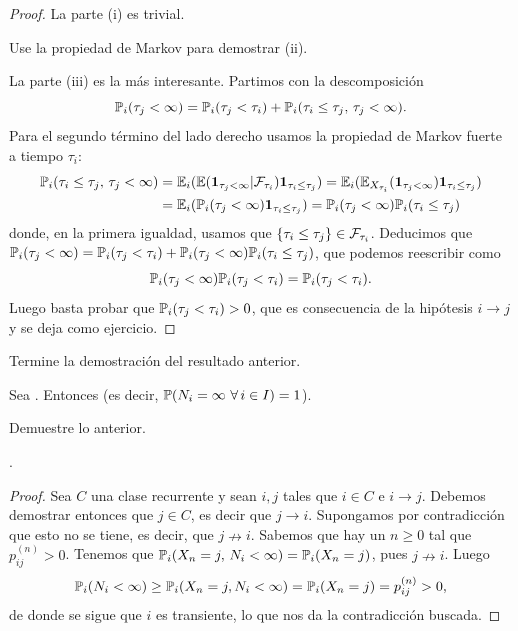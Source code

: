 \begin{proof}
La parte (i) es trivial.

\begin{exer}
Use la propiedad de Markov para demostrar (ii).
\end{exer}
\noindent La parte (iii) es la más interesante.
Partimos con la descomposición
\[\mathbb{P}_i(\tau_j<\infty)=\mathbb{P}_i(\tau_j<\tau_i)+\mathbb{P}_i(\tau_i\leq\tau_j,\,\tau_j<\infty).\]
Para el segundo término del lado derecho usamos la propiedad de Markov fuerte a tiempo $\tau_i$:
\begin{align}
\mathbb{P}_i(\tau_i\leq\tau_j,\,\tau_j<\infty)&=\mathbb{E}_i(\mathbb{E}(\mathbf{1}_{\tau_j<\infty}|\mathcal{F}_{\tau_i})\mathbf{1}_{\tau_i\leq\tau_j})=\mathbb{E}_i(\mathbb{E}_{X_{\tau_i}}(\mathbf{1}_{\tau_j<\infty})\mathbf{1}_{\tau_i\leq\tau_j})\\
&=\mathbb{E}_i(\mathbb{P}_i(\tau_j<\infty)\mathbf{1}_{\tau_i\leq\tau_j})=\mathbb{P}_i(\tau_j<\infty)\mathbb{P}_i(\tau_i\leq\tau_j)
\end{align}
donde, en la primera igualdad, usamos que $\{\tau_i\leq\tau_j\}\in\mathcal{F}_{\tau_i}$.
Deducimos que $\mathbb{P}_i(\tau_j<\infty)=\mathbb{P}_i(\tau_j<\tau_i)+\mathbb{P}_i(\tau_j<\infty)\mathbb{P}_i(\tau_i\leq\tau_j)$, que podemos reescribir como
\[\mathbb{P}_i(\tau_j<\infty)\mathbb{P}_i(\tau_j<\tau_i)=\mathbb{P}_i(\tau_j<\tau_i).\]
Luego basta probar que $\mathbb{P}_i(\tau_j<\tau_i)>0$, que es consecuencia de la hipótesis $i\rightarrow j$ y se deja como ejercicio.
\end{proof}

\begin{exer}
Termine la demostración del resultado anterior.
\end{exer}

\begin{cor}
Sea .
Entonces  (es decir, $\mathbb{P}(N_i=\infty~\forall\,i\in I)=1$).
\end{cor}

\begin{exer}
Demuestre lo anterior.
\end{exer}

\NAM[]{\newpage}

\begin{prop}
.
\end{prop}

\begin{proof}
Sea $C$ una clase recurrente y sean $i,j$ tales que $i\in C$ e $i\rightarrow j$.
Debemos demostrar entonces que $j\in C$, es decir que $j\rightarrow i$.
Supongamos por contradicción que esto no se tiene, es decir, que $j\nrightarrow i$.
Sabemos que hay un $n\geq0$ tal que $p_{ij}^{(n)}>0$.
Tenemos que $\mathbb{P}_i(X_n=j,\,N_i<\infty)=\mathbb{P}_i(X_n=j)$, pues $j\nrightarrow i$.
Luego
\[\mathbb{P}_i(N_i<\infty)\geq\mathbb{P}_i(X_n=j,N_i<\infty)=\mathbb{P}_i(X_n=j)=p_{ij}^{(n)}>0,\]
de donde se sigue que $i$ es transiente, lo que nos da la contradicción buscada.
\end{proof}


